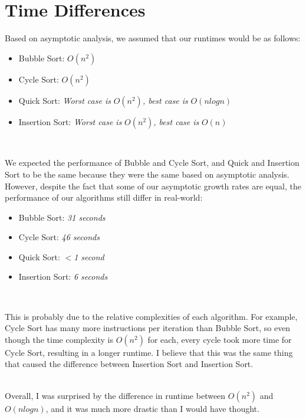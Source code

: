 \documentclass[journal]{IEEEtran}
\begin{document}
\section{Time Differences}
Based on asymptotic analysis, we assumed that our runtimes would be as follows:
\begin{itemize}
    \item Bubble Sort: $O(n^2)$
    \item Cycle Sort: $O(n^2)$
    \item Quick Sort: \textit{Worst case is }$O(n^2)$\textit{, best case is }$O(nlogn)$
    \item Insertion Sort: \textit{Worst case is }$O(n^2)$\textit{, best case is }$O(n)$
\end{itemize}\\ \par
We expected the performance of Bubble and Cycle Sort, and Quick and Insertion Sort to be the same because they were the same based on asymptotic analysis. However, despite the fact that some of our asymptotic growth rates are equal, the performance of our algorithms still differ in real-world:
\begin{itemize}
    \item Bubble Sort: \textit{31 seconds}
    \item Cycle Sort: \textit{46 seconds}
    \item Quick Sort: $<$\textit{1 second}
    \item Insertion Sort: \textit{6 seconds}
\end{itemize}\\ \par
This is probably due to the relative complexities of each algorithm. For example, Cycle Sort has many more instructions per iteration than Bubble Sort, so even though the time complexity is $O(n^2)$ for each, every cycle took more time for Cycle Sort, resulting in a longer runtime. I believe that this was the same thing that caused the difference between Insertion Sort and Insertion Sort.\par
\\Overall, I was surprised by the difference in runtime between $O(n^2)$ and $O(nlogn)$, and it was much more drastic than I would have thought.
\\
\\
\\
\\
\\
\\
\end{document}
